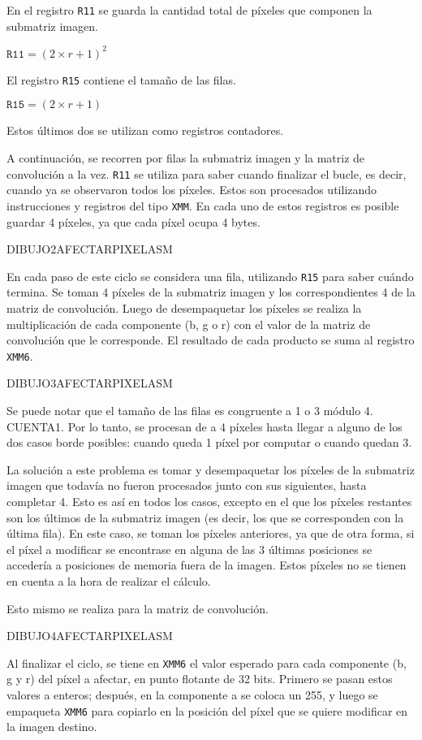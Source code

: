         En el registro \texttt{R11} se guarda la cantidad total de píxeles que componen la submatriz imagen. 

              $\mathtt{R11} = (2 \times r + 1)^{2}$  
        
        El registro \texttt{R15} contiene el tamaño de las filas.
        
              $\mathtt{R15} = (2 \times r + 1)$

        Estos últimos dos se utilizan como registros contadores.

        A continuación, se recorren por filas la submatriz imagen y la matriz de convolución a la vez. \texttt{R11} se utiliza para saber cuando finalizar el bucle, es decir, cuando ya se observaron todos los píxeles. Estos son procesados utilizando instrucciones  y registros del tipo \texttt{XMM}. En cada uno de estos registros es posible guardar 4 píxeles, ya que cada píxel ocupa 4 bytes. 

        DIBUJO2AFECTARPIXELASM
  
        En cada paso de este ciclo se considera una fila, utilizando \texttt{R15} para saber cuándo termina. Se toman 4 píxeles de la submatriz imagen y los correspondientes 4 de la matriz de convolución. Luego de desempaquetar los píxeles se realiza la multiplicación de cada componente (\textsf{b}, \textsf{g} o \textsf{r}) con el valor de la matriz de convolución que le corresponde. El resultado de cada producto se suma al registro \texttt{XMM6}. 

        DIBUJO3AFECTARPIXELASM  

        Se puede notar que el tamaño de las filas es congruente a 1 o 3 módulo 4. 
        CUENTA1. Por lo tanto, se procesan de a 4 píxeles hasta llegar a alguno de los dos casos borde posibles: cuando queda 1 píxel por computar o cuando quedan 3. 
        
        La solución a este problema es tomar y desempaquetar los píxeles de la submatriz imagen que todavía no fueron procesados junto con sus siguientes, hasta completar 4. Esto es así en todos los casos, excepto en el que los píxeles restantes son los últimos de la submatriz imagen (es decir, los que se corresponden con la última fila). En este caso, se toman los píxeles anteriores, ya que de otra forma, si el píxel a modificar se encontrase en alguna de las 3 últimas posiciones se accedería a posiciones de memoria fuera de la imagen. Estos píxeles no se tienen en cuenta a la hora de realizar el cálculo.

        Esto mismo se realiza para la matriz de convolución.
          
        DIBUJO4AFECTARPIXELASM

        Al finalizar el ciclo, se tiene en \texttt{XMM6} el valor esperado para cada componente (\textsf{b}, \textsf{g} y \textsf{r}) del píxel a afectar, en punto flotante de 32 bits. Primero se pasan estos valores a enteros; después, en la componente \textsf{a} se coloca un 255, y luego se empaqueta \texttt{XMM6} para copiarlo en la posición del píxel que se quiere modificar en la imagen destino.
